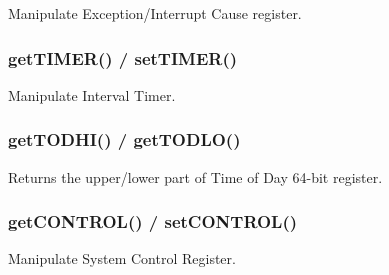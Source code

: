 Manipulate Exception/Interrupt Cause register.

\subsubsection{getTIMER() / setTIMER()}

Manipulate Interval Timer.

\subsubsection{getTODHI() / getTODLO()}

Returns the upper/lower part of Time of Day 64-bit register.

\subsubsection{getCONTROL() / setCONTROL()}

Manipulate System Control Register.